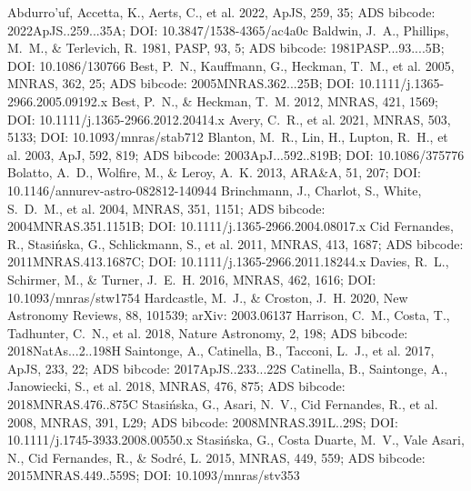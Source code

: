 \documentclass[twocolumn]{aastex631}
\begin{document}
\begin{thebibliography}{}
 Abdurro'uf, Accetta, K., Aerts, C., et al. 2022, ApJS, 259, 35; ADS bibcode: 2022ApJS..259...35A; DOI: 10.3847/1538-4365/ac4a0c
 Baldwin, J.~A., Phillips, M.~M., \& Terlevich, R. 1981, PASP, 93, 5; ADS bibcode: 1981PASP...93....5B; DOI: 10.1086/130766
 Best, P.~N., Kauffmann, G., Heckman, T.~M., et al. 2005, MNRAS, 362, 25; ADS bibcode: 2005MNRAS.362...25B; DOI: 10.1111/j.1365-2966.2005.09192.x
 Best, P.~N., \& Heckman, T.~M. 2012, MNRAS, 421, 1569; DOI: 10.1111/j.1365-2966.2012.20414.x
 Avery, C.~R., et al. 2021, MNRAS, 503, 5133; DOI: 10.1093/mnras/stab712
 Blanton, M.~R., Lin, H., Lupton, R.~H., et al. 2003, ApJ, 592, 819; ADS bibcode: 2003ApJ...592..819B; DOI: 10.1086/375776
 Bolatto, A.~D., Wolfire, M., \& Leroy, A.~K. 2013, ARA\&A, 51, 207; DOI: 10.1146/annurev-astro-082812-140944
 Brinchmann, J., Charlot, S., White, S.~D.~M., et al. 2004, MNRAS, 351, 1151; ADS bibcode: 2004MNRAS.351.1151B; DOI: 10.1111/j.1365-2966.2004.08017.x
 Cid Fernandes, R., Stasi{\'n}ska, G., Schlickmann, S., et al. 2011, MNRAS, 413, 1687; ADS bibcode: 2011MNRAS.413.1687C; DOI: 10.1111/j.1365-2966.2011.18244.x
 Davies, R.~L., Schirmer, M., \& Turner, J.~E.~H. 2016, MNRAS, 462, 1616; DOI: 10.1093/mnras/stw1754
 Hardcastle, M.~J., \& Croston, J.~H. 2020, New Astronomy Reviews, 88, 101539; arXiv: 2003.06137
 Harrison, C.~M., Costa, T., Tadhunter, C.~N., et al. 2018, Nature Astronomy, 2, 198; ADS bibcode: 2018NatAs...2..198H
 Saintonge, A., Catinella, B., Tacconi, L.~J., et al. 2017, ApJS, 233, 22; ADS bibcode: 2017ApJS..233...22S
 Catinella, B., Saintonge, A., Janowiecki, S., et al. 2018, MNRAS, 476, 875; ADS bibcode: 2018MNRAS.476..875C
 Stasi{\'n}ska, G., Asari, N.~V., Cid Fernandes, R., et al. 2008, MNRAS, 391, L29; ADS bibcode: 2008MNRAS.391L..29S; DOI: 10.1111/j.1745-3933.2008.00550.x
 Stasi{\'n}ska, G., Costa Duarte, M.~V., Vale Asari, N., Cid Fernandes, R., \& Sodr{\'e}, L. 2015, MNRAS, 449, 559; ADS bibcode: 2015MNRAS.449..559S; DOI: 10.1093/mnras/stv353

\end{thebibliography}
\end{document}
